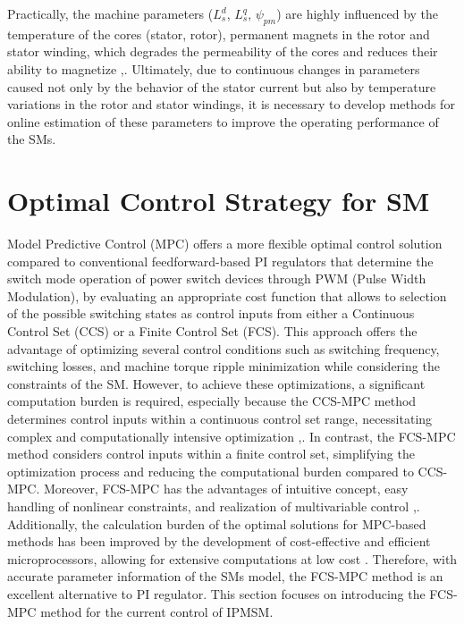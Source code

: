 Practically, the machine parameters ($L^d_s$, $L^q_s$, $\psi_{pm}$) are highly influenced by the temperature of the cores (stator, rotor), permanent magnets in the rotor and stator winding, which degrades the permeability of the cores and reduces their ability to magnetize \cite{k1},\cite{k2}. Ultimately, due to continuous changes in parameters caused not only by the behavior of the stator current but also by temperature variations in the rotor and stator windings, it is necessary to develop methods for online estimation of these parameters to improve the operating performance of the SMs.

\section{Optimal Control Strategy for SM}\label{chap2:2.2} 
Model Predictive Control (MPC) offers a more flexible optimal control solution compared to conventional feedforward-based PI regulators that determine the switch mode operation of power switch devices through PWM (Pulse Width Modulation), by evaluating an appropriate cost function that allows to selection of the possible switching states as control inputs from either a Continuous Control Set (CCS) or a Finite Control Set (FCS). This approach offers the advantage of optimizing several control conditions such as switching frequency, switching losses, and machine torque ripple minimization while considering the constraints of the SM. However, to achieve these optimizations, a significant computation burden is required, especially because the CCS-MPC method determines control inputs within a continuous control set range, necessitating complex and computationally intensive optimization \cite{c2.2_5},\cite{c2.2_6}. In contrast, the FCS-MPC method considers control inputs within a finite control set, simplifying the optimization process and reducing the computational burden compared to CCS-MPC. Moreover, FCS-MPC has the advantages of intuitive concept, easy handling of nonlinear constraints, and realization of multivariable control \cite{c2.2_1},\cite{c2.2_2}.
Additionally, the calculation burden of the optimal solutions for MPC-based methods has been improved by the development of cost-effective and efficient microprocessors, allowing for extensive computations at low cost \cite{c2.2_3}. Therefore, with accurate parameter information of the SMs model, the FCS-MPC method is an excellent alternative to PI regulator. This section focuses on introducing the FCS-MPC method for the current control of IPMSM.

